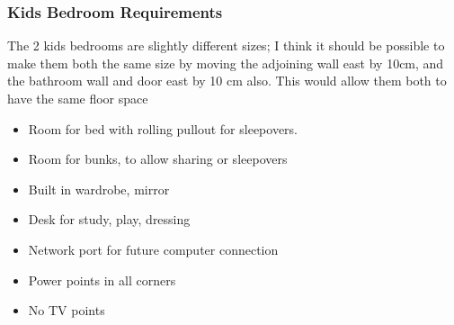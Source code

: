 \subsubsection{Kids Bedroom Requirements}
The 2 kids bedrooms are slightly different sizes; I think it should be possible to make them both the same size by moving the adjoining wall east by 10cm, and the bathroom wall and door east by 10 cm also. This would allow them both to have the same floor space

\begin{itemize}
\item Room for bed with rolling pullout for sleepovers. 
\item Room for bunks, to allow sharing or sleepovers
\item Built in wardrobe, mirror
\item Desk for study, play, dressing
\item Network port for future computer connection
\item Power points in all corners
\item No TV points
\end{itemize}
